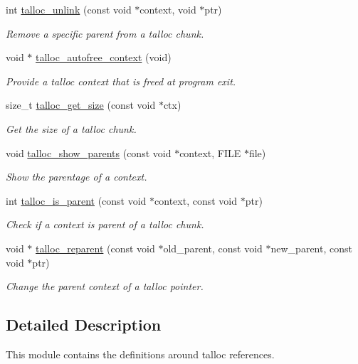 \begin{DoxyCompactItemize}
\item 
int \hyperlink{group__talloc__ref_ga8054dd3561f33dd4a0d6942839868bb5}{talloc\+\_\+unlink} (const void $\ast$context, void $\ast$ptr)
\begin{DoxyCompactList}\small\item\em Remove a specific parent from a talloc chunk. \end{DoxyCompactList}\item 
void $\ast$ \hyperlink{group__talloc__ref_ga68f90d9a904bc2125b9bb60146f004de}{talloc\+\_\+autofree\+\_\+context} (void)
\begin{DoxyCompactList}\small\item\em Provide a talloc context that is freed at program exit. \end{DoxyCompactList}\item 
size\+\_\+t \hyperlink{group__talloc__ref_ga0cbdb71be91a8a1e8f9dc6486beb690f}{talloc\+\_\+get\+\_\+size} (const void $\ast$ctx)
\begin{DoxyCompactList}\small\item\em Get the size of a talloc chunk. \end{DoxyCompactList}\item 
void \hyperlink{group__talloc__ref_gaba977c578a3d871e6f1ec53b67495ce2}{talloc\+\_\+show\+\_\+parents} (const void $\ast$context, F\+I\+L\+E $\ast$file)
\begin{DoxyCompactList}\small\item\em Show the parentage of a context. \end{DoxyCompactList}\item 
int \hyperlink{group__talloc__ref_ga7d00105b11e2a92a2e6972b3d0df0ba5}{talloc\+\_\+is\+\_\+parent} (const void $\ast$context, const void $\ast$ptr)
\begin{DoxyCompactList}\small\item\em Check if a context is parent of a talloc chunk. \end{DoxyCompactList}\item 
void $\ast$ \hyperlink{group__talloc__ref_gad08d78c3987437a5753efc55379f0566}{talloc\+\_\+reparent} (const void $\ast$old\+\_\+parent, const void $\ast$new\+\_\+parent, const void $\ast$ptr)
\begin{DoxyCompactList}\small\item\em Change the parent context of a talloc pointer. \end{DoxyCompactList}\end{DoxyCompactItemize}


\subsection{Detailed Description}
This module contains the definitions around talloc references. 



